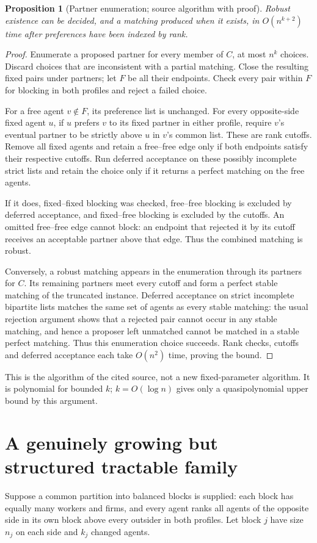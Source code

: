 \documentclass[11pt,a4paper]{article}
\newtheorem{proposition}[theorem]{Proposition}
\theoremstyle{definition}
\theoremstyle{remark}
\begin{document}
\begin{proposition}[Partner enumeration; source algorithm with proof]
Robust existence can be decided, and a matching produced when it exists, in $O(n^{k+2})$ time after preferences have been indexed by rank.
\end{proposition}
\begin{proof}
Enumerate a proposed partner for every member of $C$, at most $n^k$ choices. Discard choices that are inconsistent with a partial matching. Close the resulting fixed pairs under partners; let $F$ be all their endpoints. Check every pair within $F$ for blocking in both profiles and reject a failed choice.

For a free agent $v\notin F$, its preference list is unchanged. For every opposite-side fixed agent $u$, if $u$ prefers $v$ to its fixed partner in either profile, require $v$'s eventual partner to be strictly above $u$ in $v$'s common list. These are rank cutoffs. Remove all fixed agents and retain a free--free edge only if both endpoints satisfy their respective cutoffs. Run deferred acceptance on these possibly incomplete strict lists and retain the choice only if it returns a perfect matching on the free agents.

If it does, fixed--fixed blocking was checked, free--free blocking is excluded by deferred acceptance, and fixed--free blocking is excluded by the cutoffs. An omitted free--free edge cannot block: an endpoint that rejected it by its cutoff receives an acceptable partner above that edge. Thus the combined matching is robust.

Conversely, a robust matching appears in the enumeration through its partners for $C$. Its remaining partners meet every cutoff and form a perfect stable matching of the truncated instance. Deferred acceptance on strict incomplete bipartite lists matches the same set of agents as every stable matching: the usual rejection argument shows that a rejected pair cannot occur in any stable matching, and hence a proposer left unmatched cannot be matched in a stable perfect matching. Thus this enumeration choice succeeds. Rank checks, cutoffs and deferred acceptance each take $O(n^2)$ time, proving the bound.
\end{proof}

This is the algorithm of the cited source, not a new fixed-parameter algorithm. It is polynomial for bounded $k$; $k=O(\log n)$ gives only a quasipolynomial upper bound by this argument.

\section{A genuinely growing but structured tractable family}
Suppose a common partition into balanced blocks is supplied: each block has equally many workers and firms, and every agent ranks all agents of the opposite side in its own block above every outsider in both profiles. Let block $j$ have size $n_j$ on each side and $k_j$ changed agents.
\end{document}

